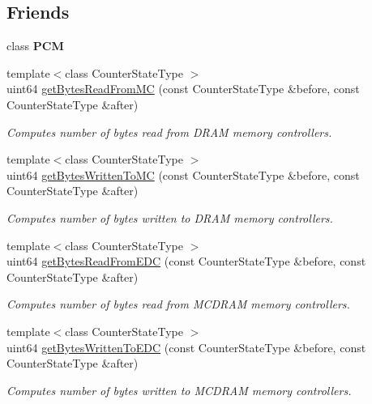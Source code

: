 \subsection*{Friends}
\begin{DoxyCompactItemize}
\item 
\mbox{\label{class_uncore_counter_state_ab5f56d2e95ba3daf52c17b8a1d356d64}} 
class {\bfseries P\+CM}
\item 
{\footnotesize template$<$class Counter\+State\+Type $>$ }\\uint64 \mbox{\hyperlink{class_uncore_counter_state_a0f28a32a3edeaecd916ba097aee99d7f}{get\+Bytes\+Read\+From\+MC}} (const Counter\+State\+Type \&before, const Counter\+State\+Type \&after)
\begin{DoxyCompactList}\small\item\em Computes number of bytes read from D\+R\+AM memory controllers. \end{DoxyCompactList}\item 
{\footnotesize template$<$class Counter\+State\+Type $>$ }\\uint64 \mbox{\hyperlink{class_uncore_counter_state_a24fce7df2ee7140db18ecfcd74fe63d1}{get\+Bytes\+Written\+To\+MC}} (const Counter\+State\+Type \&before, const Counter\+State\+Type \&after)
\begin{DoxyCompactList}\small\item\em Computes number of bytes written to D\+R\+AM memory controllers. \end{DoxyCompactList}\item 
{\footnotesize template$<$class Counter\+State\+Type $>$ }\\uint64 \mbox{\hyperlink{class_uncore_counter_state_a8a7e839f24a02691d4b3509fc2adee51}{get\+Bytes\+Read\+From\+E\+DC}} (const Counter\+State\+Type \&before, const Counter\+State\+Type \&after)
\begin{DoxyCompactList}\small\item\em Computes number of bytes read from M\+C\+D\+R\+AM memory controllers. \end{DoxyCompactList}\item 
{\footnotesize template$<$class Counter\+State\+Type $>$ }\\uint64 \mbox{\hyperlink{class_uncore_counter_state_aface6421f7c3e654bcf411abd7cea990}{get\+Bytes\+Written\+To\+E\+DC}} (const Counter\+State\+Type \&before, const Counter\+State\+Type \&after)
\begin{DoxyCompactList}\small\item\em Computes number of bytes written to M\+C\+D\+R\+AM memory controllers. \end{DoxyCompactList}\item 

\end{DoxyCompactItemize}
